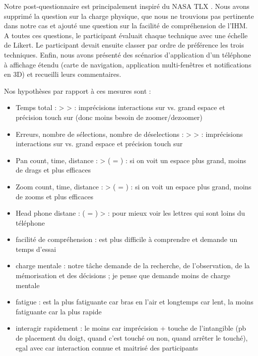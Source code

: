Notre post-questionnaire est principalement inspiré du NASA TLX \cite{Rubio2004}. Nous avons supprimé la question sur la charge physique, que nous ne trouvions pas pertinente dans notre cas et ajouté une question sur la facilité de compréhension de l'IHM. A toutes ces questions, le participant évaluait chaque technique avec une échelle de Likert. Le participant devait ensuite classer par ordre de préférence les trois techniques. Enfin, nous avons présenté des scénarios d'application d'un téléphone à affichage étendu (carte de navigation, application multi-fenêtres et notifications en 3D) et recueilli leurs commentaires.

Nos hypothèses par rapport à ces mesures sont :
\begin{itemize}
  \item Temps total :  >  >  : imprécisions interactions sur  vs. grand espace et précision touch sur  (donc moins besoin de zoomer/dezoomer)
  \item Erreurs, nombre de sélections, nombre de déselections :  >  >  : imprécisions interactions sur  vs. grand espace et précision touch sur 
  \item Pan count, time, distance :  > ( = ) : si on voit un espace plus grand, moins de drags et plus efficaces
  \item Zoom count, time, distance :  > ( = ) : si on voit un espace plus grand, moins de zooms et plus efficaces
  \item Head phone distane : ( = ) >  : pour mieux voir les lettres qui sont loins du téléphone
  \item facilité de compréhension :  est plus difficile à comprendre et demande un temps d'essai
  \item charge mentale : notre tâche demande de la recherche, de l'observation, de la mémorisation et des décisions ; je pense que  demande moins de charge mentale
  \item fatigue :  est la plus fatiguante car bras en l'air et longtemps car lent,  la moins fatiguante car la plus rapide
  \item interagir rapidement :  le moins car imprécision + touche de l'intangible (pb de placement du doigt, quand c'est touché ou non, quand arrêter le touché),  egal avec  car interaction connue et maitrisé des participants

\end{itemize}

